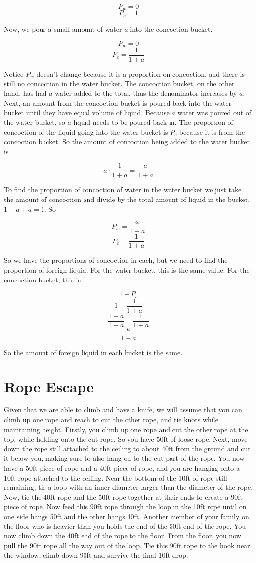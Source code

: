 \documentclass[12pt]{article}
\begin{document}
\[P_w = 0\]
\[P_c = 1\]

Now, we pour a small amount of water $a$ into the concoction bucket. 

\[P_w = 0\]
\[P_c = \frac{1}{1 + a}\]

Notice $P_w$ doesn't change because it is a proportion on concoction, and there is still no concoction in the water bucket. The concoction bucket, on the other hand, has had $a$ water added to the total, thus the denominator increases by $a$. Next, an amount from the concoction bucket is poured back into the water bucket until they have equal volume of liquid. Because $a$ water was poured out of the water bucket, so $a$ liquid needs to be poured back in. The proportion of concoction of the liquid going into the water bucket is $P_c$ because it is from the concoction bucket. So the amount of concoction being added to the water bucket is 

\[a \cdot \frac{1}{1+a} = \frac{a}{1+a}\]

To find the proportion of concoction of water in the water bucket we just take the amount of concoction and divide by the total amount of liquid in the bucket, $1 - a + a = 1$. So

\[P_w = \frac{a}{1+a}\]
\[P_c = \frac{1}{1 + a}\]

So we have the proportions of concoction in each, but we need to find the proportion of foreign liquid. For the water bucket, this is the same value. For the concoction bucket, this is

\[1 - P_c\]
\[1- \frac{1}{1 + a}\]
\[\frac{1+a}{1+a} - \frac{1}{1 + a}\]
\[\frac{a}{1+a}\]

So the amount of foreign liquid in each bucket is the same.

\section*{Rope Escape}
Given that we are able to climb and have a knife, we will assume that you can climb up one rope and reach to cut the other rope, and tie knots while maintaining height. Firstly, you climb up one rope and cut the other rope at the top, while holding onto the cut rope. So you have 50ft of loose rope. Next, move down the rope still attached to the ceiling to about 40ft from the ground and cut it below you, making sure to also hang on to the cut part of the rope. You now have a 50ft piece of rope and a 40ft piece of rope, and you are hanging onto a 10ft rope attached to the ceiling. Near the bottom of the 10ft of rope still remaining, tie a loop with an inner diameter larger than the diameter of the rope. Now, tie the 40ft rope and the 50ft rope together at their ends to create a 90ft piece of rope. Now feed this 90ft rope through the loop in the 10ft rope until on one side hangs 50ft and the other hangs 40ft. Another member of your family on the floor who is heavier than you holds the end of the 50ft end of the rope. You now climb down the 40ft end of the rope to the floor. From the floor, you now pull the 90ft rope all the way out of the loop. Tie this 90ft rope to the hook near the window, climb down 90ft and survive the final 10ft drop.
\end{document}
